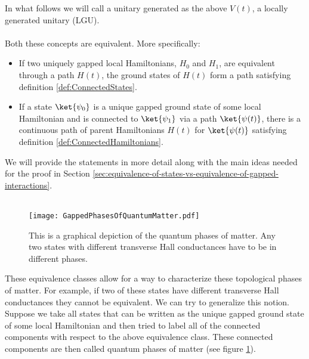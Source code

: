 In what follows we will call a unitary generated as the above $V(t)$, a locally generated unitary (LGU).\\\\
Both these concepts are equivalent. More specifically:
\begin{itemize}
	\item If two uniquely gapped local Hamiltonians, $H_0$ and $H_1$, are equivalent through a path $H(t)$, the ground states of $H(t)$ form a path satisfying definition \ref{def:ConnectedStates}.
	\item If a state $\ket{\psi_0}$ is a unique gapped ground state of some local Hamiltonian and is connected to $\ket{\psi_1}$ via a path $\ket{\psi(t)}$, there is a continuous path of parent Hamiltonians $H(t)$ for $\ket{\psi(t)}$ satisfying definition \ref{def:ConnectedHamiltonians}.
\end{itemize}
We will provide the statements in more detail along with the main ideas needed for the proof in Section \ref{sec:equivalence-of-states-vs-equivalence-of-gapped-interactions}.\\\\
\begin{figure}
	\centering
	\texttt{[image: GappedPhasesOfQuantumMatter.pdf]}
	\caption{This is a graphical depiction of the quantum phases of matter. Any two states with different transverse Hall conductances have to be in different phases.}
	\label{fig:GappedPhasesOfQuantumMatter}
\end{figure}
These equivalence classes allow for a way to characterize these topological phases of matter. For example, if two of these states have different transverse Hall conductances they cannot be equivalent. We can try to generalize this notion. Suppose we take all states that can be written as the unique gapped ground state of some local Hamiltonian and then tried to label all of the connected components with respect to the above equivalence class. These connected components are then called quantum phases of matter (see figure \ref{fig:GappedPhasesOfQuantumMatter}).
